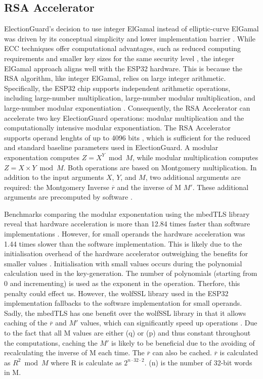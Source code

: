 \subsection{\ac{RSA} Accelerator}
ElectionGuard's decision to use integer ElGamal instead of elliptic-curve ElGamal was driven by its conceptual simplicity and lower implementation barrier \cite[7]{eg-paper}. While \ac{ECC} techniques offer computational advantages, such as reduced computing requirements and smaller key sizes for the same security level \cite[1, 6]{ecc-eval}, the integer ElGamal approach aligns well with the ESP32 hardware. This is because the \ac{RSA} algorithm, like integer ElGamal, relies on large integer arithmetic. Specifically, the ESP32 chip supports independent arithmetic operations, including large-number multiplication, large-number modular multiplication, and large-number modular exponentiation \cite[32]{esp32-series} \cite[603]{esp32-ref}. Consequently, the RSA Accelerator can accelerate two key ElectionGuard operations: modular multiplication and the computationally intensive modular exponentiation. The RSA Accelerator supports operand lenghts of up to 4096 bits \cite[603]{esp32-ref}, which is sufficient for the reduced and standard baseline parameters used in ElectionGuard. A modular exponentation computes \( Z = X^Y \bmod M \), while modular multiplication computes \( Z = X \times Y \bmod M \). Both operations are based on Montgomery multiplication. In addition to the input arguments \( X \), \( Y \), and \( M \), two additional arguments are required: the Montgomery Inverse \( \overline{r} \) and the inverse of M \( M' \). These additional arguments are precomputed by software \cite[598-599]{esp32-ref}. 

Benchmarks comparing the modular exponentation using the mbedTLS library reveal that hardware acceleration is more than 12.84 times faster than software implementations \cite[51]{eval-crypto}. However, for small operands the hardware acceleration was 1.44 times slower than the software implementation. This is likely due to the initialisation overhead of the hardware accelerator outweighing the benefits for smaller values \cite[51]{eval-crypto}. Initialisation with small values occurs during the polynomial calculation used in the key-generation. The number of polynomials (starting from 0 and incrementing) is used as the exponent in the operation. Therfore, this penalty could effect us. However, the wolfSSL library used in the ESP32 implementation fallbacks to the software implementation for small operands. Sadly, the mbedTLS has one benefit over the wolfSSL library in that it allows caching of the \( \overline{r} \) and \( M' \) values, which can significantly speed up operations \cite[51]{eval-crypto}. Due to the fact that all M values are either (q) or (p) and thus constant throughout the computations, caching the \( M' \) is likely to be beneficial due to the avoiding of recalculating the inverse of M each time. The \( \overline{r} \) can also be cached. \( \overline{r} \) is calculated as \( R^2 \bmod M \) where R is calculate as \(2^{n \cdot 32 \cdot 2}\). (n) is the number of 32-bit words in M.

